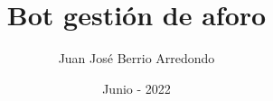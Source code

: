 
\newcommand{\NombreAutor}{ Juan José Berrio Arredondo }

\newcommand{\Grado}{ Grado en Ingeniería Informática }

\newcommand{\TituloTFG}{ Bot gestión de aforo}

\newcommand{\NombreTutor}{ Vicente Martínez  }

\newcommand{\Departamento}{ Inteligencia Artificial }

\newcommand{\Fecha}{ Junio - 2022 }

\title{\TituloTFG}
\author{\NombreAutor}
\date{\Fecha}
